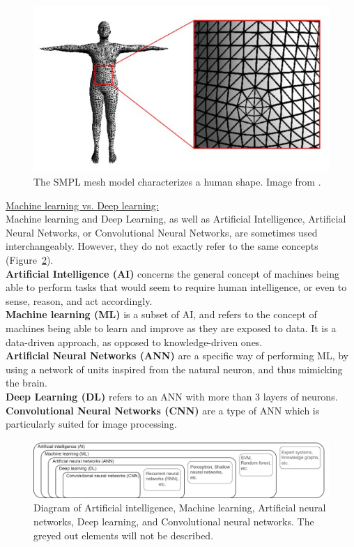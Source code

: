 \begin{figure}[hbtp]
	\centering
            \def\svgwidth{1\columnwidth}
            \fontsize{10pt}{10pt}\selectfont
            \includegraphics[width=0.6\linewidth]{"../Annexes/Figures/Mesh_model.jpg"}
            \caption{The SMPL mesh model characterizes a human shape. Image from \cite{Wu2020}.}
            \label{fig_meshmodel}
\end{figure}
\FloatBarrier

\vspace*{0.5cm}

\noindent\underline{Machine learning vs. Deep learning:}\\
Machine learning and Deep Learning, as well as Artificial Intelligence, Artificial Neural Networks, or Convolutional Neural Networks, are sometimes used interchangeably. However, they do not exactly refer to the same concepts (Figure~\ref{fig_ai}).\\
\textbf{Artificial Intelligence (AI)} concerns the general concept of machines being able to perform tasks that would seem to require human intelligence, or even to sense, reason, and act accordingly. \\
\textbf{Machine learning (ML)} is a subset of AI, and refers to the concept of machines being able to learn and improve as they are exposed to data. It is a data-driven approach, as opposed to knowledge-driven ones.\\
\textbf{Artificial Neural Networks (ANN)} are a specific way of performing ML, by using a network of units inspired from the natural neuron, and thus mimicking the brain. \\
\textbf{Deep Learning (DL)} refers to an ANN with more than 3 layers of neurons.\\
\textbf{Convolutional Neural Networks (CNN)} are a type of ANN which is particularly suited for image processing.

\begin{figure}[hbtp]
	\centering
            \def\svgwidth{1\columnwidth}
            \fontsize{10pt}{10pt}\selectfont
            \includegraphics[width=\linewidth]{"../Annexes/Figures/AI_CNN_etc.png"}
            \caption{Diagram of Artificial intelligence, Machine learning, Artificial neural networks, Deep learning, and Convolutional neural networks. The greyed out elements will not be described.}
            \label{fig_ai}
\end{figure}
\FloatBarrier
\vspace*{0.5cm}

